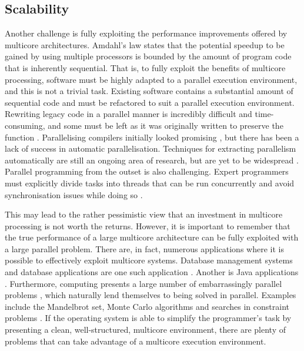 \documentclass[bsc,frontabs,singlespacing,parskip,deptreport]{infthesis}
\begin{document}
\subsection{Scalability} \label{scalability-challenges}
Another challenge is fully exploiting the performance improvements offered by multicore architectures. Amdahl’s law \cite{DBLP:conf/afips/Amdahl67} \cite{DBLP:journals/computer/Amdahl13} states that the potential speedup to be gained by using multiple processors is bounded by the amount of program code that is inherently sequential. That is, to fully exploit the benefits of multicore processing, software must be highly adapted to a parallel execution environment, and this is not a trivial task. Existing software contains a substantial amount of sequential code and must be refactored to suit a parallel execution environment. Rewriting legacy code in a parallel manner is incredibly difficult and time-consuming, and some must be left as it was originally written to preserve the function \cite{geer}. Parallelising compilers initially looked promising \cite{lamport}, but there has been a lack of success in automatic parallelisation. Techniques for extracting parallelism automatically are still an ongoing area of research, but are yet to be widespread \cite{franke}. Parallel programming from the outset is also challenging. Expert programmers must explicitly divide tasks into threads that can be run concurrently and avoid synchronisation issues while doing so \cite{geer}. 

This may lead to the rather pessimistic view that an investment in multicore processing is not worth the returns. However, it is important to remember that the true performance of a large multicore architecture can be fully exploited with a large parallel problem. There are, in fact, numerous applications where it is possible to effectively exploit multicore systems. Database management systems and database applications are one such application \cite{DBLP:journals/queue/McDougall05}. Another is Java applications \cite{DBLP:journals/usenix-login/McDougallL06}. Furthermore, computing presents a large number of embarrassingly parallel problems \cite{DBLP:books/daglib/0020056}, which naturally lend themselves to being solved in parallel. Examples include the Mandelbrot set, Monte Carlo algorithms \cite{DBLP:conf/uai/NeiswangerWX14} and searches in constraint problems \cite{DBLP:journals/jair/MalapertRR16}. If the operating system is able to simplify the programmer's task by presenting a clean, well-structured, multicore environment, there are plenty of problems that can take advantage of a multicore execution environment.
\end{document}
